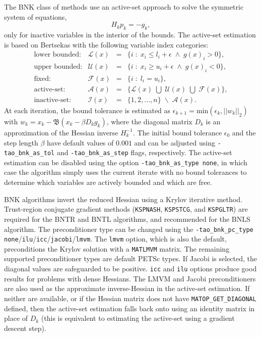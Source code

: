 The BNK class of methods use an active-set approach to solve the symmetric system of equations,
\[
H_k p_k = -g_k,
\]
only for inactive variables in the interior of the bounds. The active-set estimation is based on 
Bertsekas \cite{bertsekas:projected} with the following variable index categories:
\[
\begin{array}{rlll} \displaystyle
\mbox{lower bounded}: & \mathcal{L}(x) & = & \{ i \; : \; x_i \leq l_i + \epsilon \; \land \; g(x)_i > 0 \}, \\
\mbox{upper bounded}: & \mathcal{U}(x) & = & \{ i \; : \; x_i \geq u_i + \epsilon \; \land \; g(x)_i < 0 \}, \\
\mbox{fixed}: & \mathcal{F}(x) & = & \{ i \; : \; l_i = u_i \}, \\
\mbox{active-set}: & \mathcal{A}(x) & = & \{ \mathcal{L}(x) \; \bigcup \; \mathcal{U}(x) \; \bigcup \; \mathcal{F}(x) \}, \\
\mbox{inactive-set}: & \mathcal{I}(x) & = & \{ 1,2,\ldots,n \} \; \backslash \; \mathcal{A}(x).
\end{array}
\]
At each iteration, the bound tolerance is estimated as $\epsilon_{k+1} = \mbox{min}(\epsilon_k, ||w_k||_2)$ 
with $w_k = x_k - \mathfrak{B}(x_k - \beta D_k g_k)$, where the diagonal matrix $D_k$ is an approximation 
of the Hessian inverse $H_k^{-1}$. The initial bound tolerance $\epsilon_0$ and the step length $\beta$ 
have default values of $0.001$ and can be adjusted using {\tt -tao\_bnk\_as\_tol} and 
{\tt -tao\_bnk\_as\_step} flags, respectively. The active-set estimation can be disabled using the option 
{\tt -tao\_bnk\_as\_type none}, in which case the algorithm simply uses the current iterate with no bound 
tolerances to determine which variables are actively bounded and which are free.

BNK algorithms invert the reduced Hessian using a Krylov iterative method. Trust-region conjugate gradient 
methods ({\tt KSPNASH}, {\tt KSPSTCG}, and {\tt KSPGLTR}) are required for the BNTR and BNTL algorithms, 
and recommended for the BNLS algorithm. The preconditioner type can be changed using the 
{\tt -tao\_bnk\_pc\_type} {\tt none}/{\tt ilu}/{\tt icc}/{\tt jacobi}/{\tt lmvm}. The {\tt lmvm} option, which is 
also the default, preconditions the Krylov solution with a {\tt MATLMVM} matrix. The remaining supported 
preconditioner types are default PETSc types. If Jacobi is selected, the diagonal values are safeguarded to be positive. 
{\tt icc} and {\tt ilu} options produce good results for problems with dense Hessians. The LMVM and Jacobi 
preconditioners are also used as the approximate inverse-Hessian in the active-set estimation. 
If neither are available, or if the Hessian matrix does not have {\tt MATOP\_GET\_DIAGONAL} defined, then the 
active-set estimation falls back onto using an identity matrix in place of $D_k$ (this is equivalent to 
estimating the active-set using a gradient descent step).

